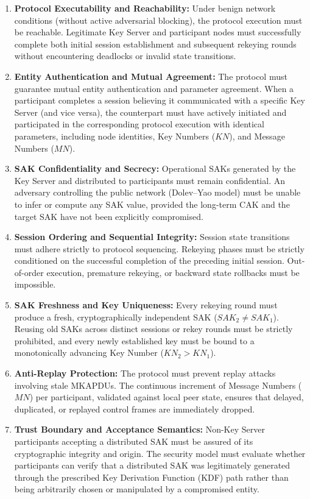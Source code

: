 \begin{enumerate}[label=\textbf{SR\arabic*.}]
  \item \textbf{Protocol Executability and Reachability:} Under benign network conditions (without active adversarial blocking), the protocol execution must be reachable. Legitimate Key Server and participant nodes must successfully complete both initial session establishment and subsequent rekeying rounds without encountering deadlocks or invalid state transitions.
  
  \item \textbf{Entity Authentication and Mutual Agreement:} The protocol must guarantee mutual entity authentication and parameter agreement. When a participant completes a session believing it communicated with a specific Key Server (and vice versa), the counterpart must have actively initiated and participated in the corresponding protocol execution with identical parameters, including node identities, Key Numbers ($KN$), and Message Numbers ($MN$).

  \item \textbf{SAK Confidentiality and Secrecy:} Operational SAKs generated by the Key Server and distributed to participants must remain confidential. An adversary controlling the public network (Dolev--Yao model) must be unable to infer or compute any SAK value, provided the long-term CAK and the target SAK have not been explicitly compromised.

  \item \textbf{Session Ordering and Sequential Integrity:} Session state transitions must adhere strictly to protocol sequencing. Rekeying phases must be strictly conditioned on the successful completion of the preceding initial session. Out-of-order execution, premature rekeying, or backward state rollbacks must be impossible.

  \item \textbf{SAK Freshness and Key Uniqueness:} Every rekeying round must produce a fresh, cryptographically independent SAK ($SAK_2 \neq SAK_1$). Reusing old SAKs across distinct sessions or rekey rounds must be strictly prohibited, and every newly established key must be bound to a monotonically advancing Key Number ($KN_2 > KN_1$).

  \item \textbf{Anti-Replay Protection:} The protocol must prevent replay attacks involving stale MKAPDUs. The continuous increment of Message Numbers ($MN$) per participant, validated against local peer state, ensures that delayed, duplicated, or replayed control frames are immediately dropped.

  \item \textbf{Trust Boundary and Acceptance Semantics:} Non-Key Server participants accepting a distributed SAK must be assured of its cryptographic integrity and origin. The security model must evaluate whether participants can verify that a distributed SAK was legitimately generated through the prescribed Key Derivation Function (KDF) path rather than being arbitrarily chosen or manipulated by a compromised entity.
\end{enumerate}
